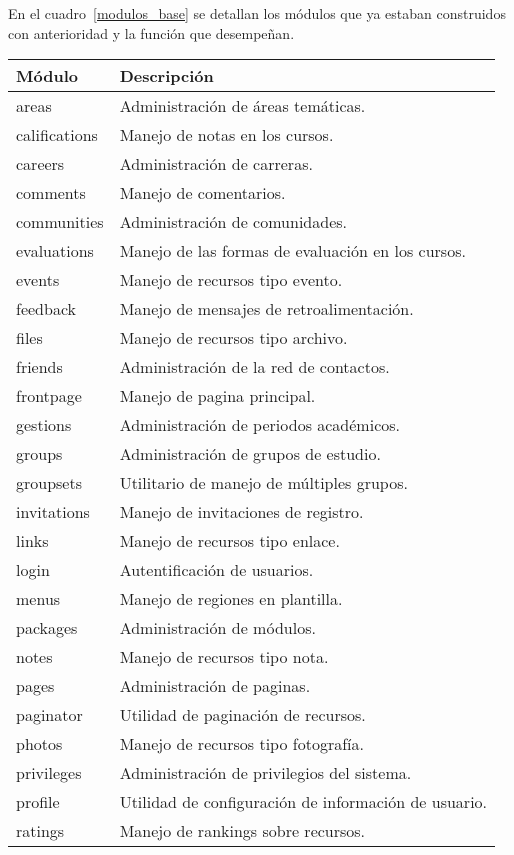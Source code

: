 En el cuadro~\ref{modulos_base} se detallan los módulos que ya estaban construidos con anterioridad y la función que
desempeñan.

\begin{table}
\begin{tabular}{l|l}
Módulo & Descripción \\
\hline
areas & Administración de áreas temáticas. \\
califications & Manejo de notas en los cursos. \\
careers & Administración de carreras. \\
comments & Manejo de comentarios. \\
communities & Administración de comunidades. \\
evaluations & Manejo de las formas de evaluación en los cursos. \\
events & Manejo de recursos tipo evento. \\
feedback & Manejo de mensajes de retroalimentación. \\
files & Manejo de recursos tipo archivo. \\
friends & Administración de la red de contactos. \\
frontpage & Manejo de pagina principal. \\
gestions & Administración de periodos académicos. \\
groups & Administración de grupos de estudio. \\
groupsets & Utilitario de manejo de múltiples grupos. \\
invitations & Manejo de invitaciones de registro. \\
links & Manejo de recursos tipo enlace. \\
login & Autentificación de usuarios. \\
menus & Manejo de regiones en plantilla. \\
packages & Administración de módulos. \\
notes & Manejo de recursos tipo nota. \\
pages & Administración de paginas. \\
paginator & Utilidad de paginación de recursos. \\
photos & Manejo de recursos tipo fotografía. \\
privileges & Administración de privilegios del sistema. \\
profile & Utilidad de configuración de información de usuario. \\
ratings & Manejo de rankings sobre recursos. \\

\end{tabular}
\end{table}
